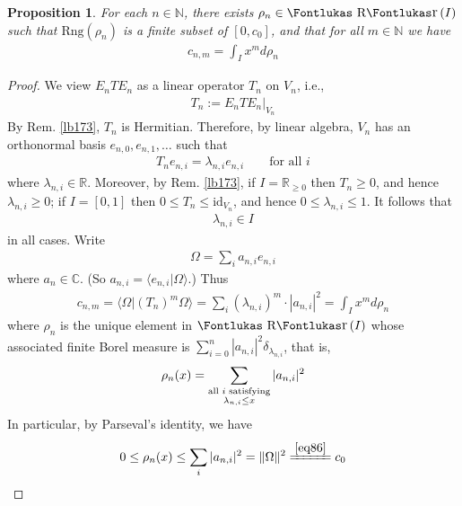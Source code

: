 \documentclass[12pt,b5paper,notitlepage]{article}
\theoremstyle{definition}
\theoremstyle{plain}
\newtheorem{pp}[df]{Proposition}
\DeclareMathOperator{\Rr}{\text{\Fontlukas R}\text{\kern -0pt {\Fontlukas\large r}}\,}
\newcommand{\id}{\mathrm{id}}
\newcommand{\bk}[1]{\langle {#1}\rangle}
\newcommand{\Cbb}{\mathbb C}
\newcommand{\Nbb}{\mathbb N}
\newcommand{\Rbb}{\mathbb R}
\newcommand{\Rng}{\mathrm{Rng}}
\numberwithin{equation}{section}
\begin{document}
\begin{pp}\label{lb174}
For each $n\in\Nbb$, there exists $\rho_n\in\Rr(I)$ such that $\Rng(\rho_n)$ is a finite subset of $[0,c_0]$, and that  for all $m\in\Nbb$ we have
\begin{align}\label{eq87}
c_{n,m}=\int_I x^md\rho_n
\end{align}
\end{pp}


\begin{proof}
We view $E_nTE_n$ as a linear operator $T_n$ on $V_n$, i.e.,
\begin{align}\label{eq120}
T_n:=E_nTE_n\big|_{V_n}
\end{align}
By Rem. \ref{lb173}, $T_n$ is Hermitian. Therefore, by linear algebra, $V_n$ has an orthonormal basis $e_{n,0},e_{n,1},\dots$ such that
\begin{align}
T_ne_{n,i}=\lambda_{n,i}e_{n,i}\qquad\text{for all }i
\end{align}
where $\lambda_{n,i}\in\Rbb$. Moreover, by Rem. \ref{lb173}, if $I=\Rbb_{\geq0}$ then $T_n\geq0$, and hence $\lambda_{n,i}\geq0$; if $I=[0,1]$ then $0\leq T_n\leq\id_{V_n}$, and hence $0\leq\lambda_{n,i}\leq 1$. It follows that
\begin{align*}
\lambda_{n,i}\in I
\end{align*}
in all cases. Write
\begin{align}
\Omega=\sum_i a_{n,i}e_{n,i}
\end{align}
where $a_n\in\Cbb$. (So $a_{n,i}=\bk{e_{n,i}|\Omega}$.) Thus
\begin{align*}
c_{n,m}=\bk{\Omega|(T_n)^m\Omega}=\sum_i (\lambda_{n,i})^m\cdot |a_{n,i}|^2=\int_I x^md\rho_n
\end{align*}
where $\rho_n$ is the unique element in $\Rr(I)$ whose associated finite Borel measure is $\sum_{i=0}^n|a_{n,i}|^2\delta_{\lambda_{n,i}}$, that is,
\begin{align}\label{eq119}
\rho_n(x)=\sum_{
\begin{subarray}{c}
\text{all $i$ satisfying}\\
\lambda_{n,i}\leq x
\end{subarray}
}|a_{n,i}|^2
\end{align}
In particular, by Parseval's identity, we have
\begin{align*}
0\leq \rho_n(x)\leq\sum_i |a_{n,i}|^2=\Vert\Omega\Vert^2\xlongequal{\eqref{eq86}}c_0
\end{align*}
\end{proof}
\end{document}
